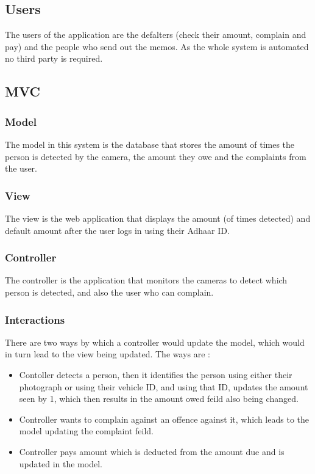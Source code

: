 \documentclass[10pt,twocolumn,letterpaper]{article}
\begin{document}
\subsection*{Users}
The users of the application are the defalters (check their amount, 
complain and pay) and the people who send out the memos. As the whole 
system is automated no third party is required.

\subsection*{MVC}

\subsubsection*{Model}
The model in this system is the database that stores the amount of times the person 
is detected by the camera, the amount they owe and the complaints 
from the user.

\subsubsection*{View}
The view is the web application that displays the amount
(of times detected) and default amount after the user logs in using their 
Adhaar ID.

\subsubsection*{Controller}
The controller is the application that monitors the cameras 
to detect which person is detected, and also the user who can complain.

\subsubsection*{Interactions}
There are two ways by which a controller would update the model, which would in turn 
lead to the view being updated. The ways are :

\begin{itemize}
    \item Contoller detects a person, then it identifies the person using either their 
    photograph or using their vehicle ID, and using that ID, updates the amount seen by 
    1, which then results in the amount owed feild also being changed.
    \item Controller wants to complain against an offence against it, which leads to the 
    model updating the complaint feild.
    \item Controller pays amount which is deducted from the amount due and is updated in 
    the model. 
\end{itemize}
\end{document}
